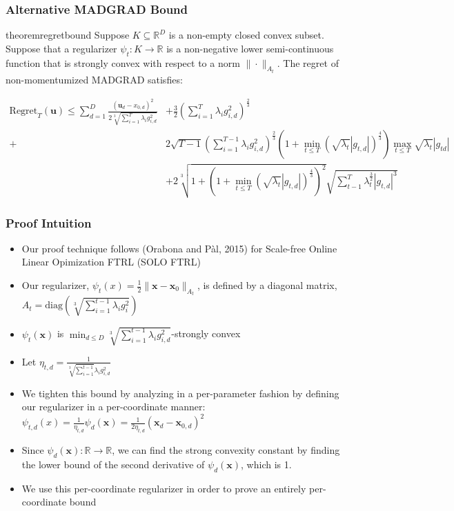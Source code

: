 \documentclass{beamer}
\newcommand{\R}{\mathbb{R}}
\newcommand{\Regret}{\text{Regret}}
\newcommand{\diag}{\text{diag}}
\newcommand{\bx}{\mathbf{x}}
\newcommand{\bu}{\mathbf{u}}
\begin{document}
\begin{frame}[shrink=20]
  \frametitle{Alternative MADGRAD Bound}
  \begin{restatable}{theorem}{regretbound}\label{theorem:1}
    Suppose $K \subseteq \R^D$ is a non-empty closed convex subset. Suppose that a regularizer $\psi_t: K \rightarrow \R$
    is a non-negative lower semi-continuous function that is strongly convex with respect to a norm $\| \cdot
    \|_{A_t}$. The regret of non-momentumized MADGRAD satisfies:

    \begin{align*}
      \Regret_T(\bu) \leq \sum\limits_{d=1}^D \frac{(\bu_d - x_{0,d})^2}{2\sqrt[3]{\sum\limits_{i=1}^{T} \lambda_i
        g_{i,d}^2}} &+ \frac{3}{2}\left(\sum\limits_{i=1}^T \lambda_i g_{i,d}^2\right)^\frac{2}{3} \\ +& 2
          \sqrt{T-1}\left(\sum_{i=1}^{T-1} \lambda_i g_{i,d}^2\right)^\frac{2}{3}(1 + \min_{t \leq
          T}(\sqrt{\lambda_t}|g_{t,d}|)^\frac{4}{3}) \max_{t \leq T} \sqrt{\lambda_t}|g_{td}| \\ &+ 2\sqrt[3]{1 + (1 +
          \min_{t \leq T}(\sqrt{\lambda_t}|g_{t,d}|)^\frac{4}{3})^2}\sqrt{\sum\limits_{t-1}^T \lambda_t^\frac{3}{2}
        |g_{t,d}|^3}
    \end{align*}
  \end{restatable}
\end{frame}

\begin{frame}[shrink=20]
  \frametitle{Proof Intuition}
  \begin{itemize}
    \item Our proof technique follows (Orabona and P\`al, 2015) for Scale-free Online Linear Opimization FTRL (SOLO FTRL)
    \item Our regularizer, $\psi_t(x) = \frac{1}{2}\|\bx - \bx_0\|_{A_t}$, is defined by a diagonal matrix, $A_t =
      \diag\left(\sqrt[3]{\sum\limits_{i=1}^{t-1} \lambda_i g_{i}^2}\right)$
    \item $\psi_t(\bx)$ is $\min_{d \leq D} \sqrt[3]{\sum\limits_{i=1}^{t-1} \lambda_i g_{i,d}^2}$-strongly convex
    \item Let $\eta_{t,d} = \frac{1}{\sqrt[3]{\sum_{i=1}^{t-1}}\lambda_i g_{i,d}^2}$
    \item We tighten this bound by analyzing in a per-parameter fashion by defining our regularizer in a per-coordinate
      manner: $\psi_{t,d}(x) = \frac{1}{\eta_{t,d}} \psi_{d}(\bx) = \frac{1}{2\eta_{t,d}}(\bx_d - \bx_{0,d})^2$
    \item Since $\psi_d(\bx): \R \rightarrow \R$, we can find the strong convexity constant by finding the lower bound
      of the second derivative of $\psi_d(\bx)$, which is 1.
    \item We use this per-coordinate regularizer in order to prove an entirely per-coordinate bound
  \end{itemize}
\end{frame}
\end{document}
